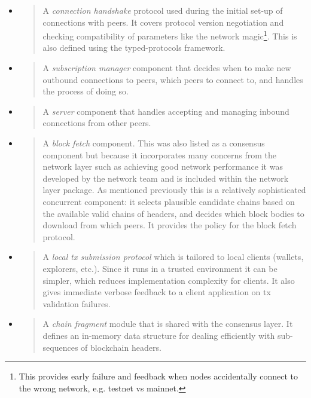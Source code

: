 \documentclass[]{article}
\begin{document}
\begin{itemize}
\item
  \begin{quote}
  A \emph{connection handshake} protocol used during the initial set-up
  of connections with peers. It covers protocol version negotiation and
  checking compatibility of parameters like the network magic\footnote{This
    provides early failure and feedback when nodes accidentally connect
    to the wrong network, e.g. testnet vs mainnet.}. This is also
  defined using the typed-protocols framework.
  \end{quote}
\item
  \begin{quote}
  A \emph{subscription manager} component that decides when to make new
  outbound connections to peers, which peers to connect to, and handles
  the process of doing so.
  \end{quote}
\item
  \begin{quote}
  A \emph{server} component that handles accepting and managing inbound
  connections from other peers.
  \end{quote}
\item
  \begin{quote}
  A \emph{block fetch} component. This was also listed as a consensus
  component but because it incorporates many concerns from the network
  layer such as achieving good network performance it was developed by
  the network team and is included within the network layer package. As
  mentioned previously this is a relatively sophisticated concurrent
  component: it selects plausible candidate chains based on the
  available valid chains of headers, and decides which block bodies to
  download from which peers. It provides the policy for the block fetch
  protocol.
  \end{quote}
\item
  \begin{quote}
  A \emph{local tx submission protocol} which is tailored to local
  clients (wallets, explorers, etc.). Since it runs in a trusted
  environment it can be simpler, which reduces implementation complexity
  for clients. It also gives immediate verbose feedback to a client
  application on tx validation failures.
  \end{quote}
\item
  \begin{quote}
  A \emph{chain fragment} module that is shared with the consensus
  layer. It defines an in-memory data structure for dealing efficiently
  with sub-sequences of blockchain headers.
  \end{quote}
\end{itemize}
\end{document}
